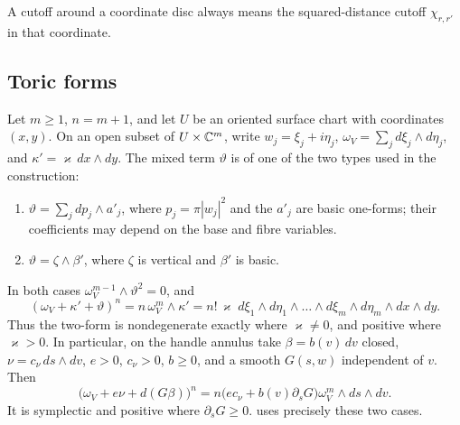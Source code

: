 A cutoff around a coordinate disc always means the squared-distance cutoff $\chi_{r,r'}$ in that coordinate.

\subsection{Toric forms}\label{sec:pre-toric}

\begin{lemma}\label{lem:pre-top-power}
Let $m\ge1$, $n=m+1$, and let $U$ be an oriented surface chart with coordinates $(x,y)$.
On an open subset of $U\times\mathbb{C}^m$, write $w_j=\xi_j+i\eta_j$,
$\omega_V=\sum_jd\xi_j\wedge d\eta_j$, and $\kappa'=\varkappa\,dx\wedge dy$.
The mixed term $\vartheta$ is of one of the two types used in the construction:
\begin{enumerate}[label=(\alph*)]
\item $\vartheta=\sum_jdp_j\wedge a'_j$, where $p_j=\pi|w_j|^2$ and the $a'_j$ are basic one-forms;
 their coefficients may depend on the base and fibre variables.
\item $\vartheta=\zeta\wedge\beta'$, where $\zeta$ is vertical and $\beta'$ is basic.
\end{enumerate}
In both cases $\omega_V^{m-1}\wedge\vartheta^2=0$, and
\[
 (\omega_V+\kappa'+\vartheta)^n
 =n\,\omega_V^m\wedge\kappa'
 =n!\,\varkappa\;d\xi_1\wedge d\eta_1\wedge\dots\wedge d\xi_m\wedge d\eta_m\wedge dx\wedge dy.
\]
Thus the two-form is nondegenerate exactly where $\varkappa\ne0$, and positive where $\varkappa>0$.
In particular, on the handle annulus take $\beta=b(v)\,dv$ closed, $\nu=c_\nu\,ds\wedge dv$,
$e>0$, $c_\nu>0$, $b\ge0$, and a smooth $G(s,w)$ independent of $v$. Then
\[
 \big(\omega_V+e\nu+d(G\beta)\big)^n
 =n\big(e c_\nu+b(v)\partial_sG\big)\omega_V^m\wedge ds\wedge dv.
\]
It is symplectic and positive where $\partial_sG\ge0$.
 uses precisely these two cases.
\end{lemma}

